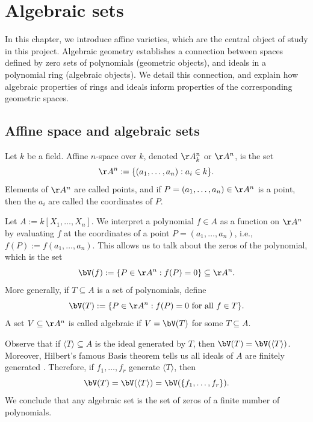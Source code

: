 \documentclass[12pt]{amsart}
\theoremstyle{plain}
\begin{document}
\newpage
{}
\section{Algebraic sets}\label{chapter:algebraicsets}
In this chapter, we introduce affine varieties, which are the central object of study in this project.
Algebraic geometry establishes a connection between spaces defined by zero sets of polynomials (geometric objects), and ideals in a polynomial ring (algebraic objects).
We detail this connection, and explain how algebraic properties of rings and ideals inform properties of the corresponding geometric spaces.





\subsection{Affine space and algebraic sets}
Let $k$ be a field.
Affine $n$-space over $k$, denoted $\AA^n_k$ or $\AA^n$, is the set 
$$\AA^n := \{(a_1, \ldots, a_n) : a_i \in k\}.$$
Elements of $\AA^n$ are called points, and if $P = (a_1, \ldots, a_n) \in \AA^n$ is a point, then the $a_i$ are called the coordinates of $P$.

Let $A := k[X_1, \ldots, X_n]$.
We interpret a polynomial $f \in A$ as a function on $\AA^n$ by evaluating $f$ at the coordinates of a point $P = (a_1, \ldots, a_n)$, i.e., $f(P) := f(a_1, \ldots, a_n).$
This allows us to talk about the zeros of the polynomial, which is the set
$$\bV(f) := \{P \in \AA^n : f(P) = 0\} \subseteq \AA^n.$$
More generally, if $T \subseteq A$ is a set of polynomials, define
$$\bV(T) := \{P \in \AA^n : f(P) = 0 \text{ for all } f \in T\}.$$
A set $V \subseteq \AA^n$ is called algebraic if $V = \bV(T)$ for some $T \subseteq A$.

Observe that if $\langle T \rangle \subseteq A$ is the ideal generated by $T$, then $\bV(T) = \bV(\langle T \rangle)$.
Moreover, Hilbert's famous Basis theorem tells us all ideals of $A$ are finitely generated \cite[\S 3.6]{Reid95}.
Therefore, if $f_1, \ldots, f_r$ generate $\langle T \rangle$, then 
$$\bV(T) = \bV(\langle T \rangle) = \bV(\{f_1, \ldots, f_r\}).$$
We conclude that any algebraic set is the set of zeros of a finite number of polynomials.
\end{document}
